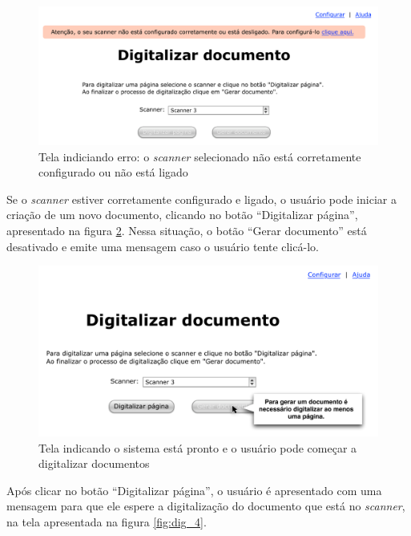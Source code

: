 \begin{figure}[h]
 \centering
  \includegraphics[scale=0.6]{img/mockups/digitalizacao-2.pdf}
  \caption {Tela indiciando erro: o {\it scanner} selecionado não está corretamente configurado ou não está ligado}
  \label{fig:dig_2}
\end{figure}

Se o {\it scanner} estiver corretamente configurado e ligado, o usuário pode iniciar a criação de um novo documento, clicando no botão ``Digitalizar página'', apresentado na figura \ref{fig:dig_3}. Nessa situação, o botão ``Gerar documento'' está desativado e emite uma mensagem caso o usuário tente clicá-lo.

\begin{figure}[h]
 \centering
  \includegraphics[scale=0.6]{img/mockups/digitalizacao-3.pdf}
  \caption {Tela indicando o sistema está pronto e o usuário pode começar a digitalizar documentos}
  \label{fig:dig_3}
\end{figure}

Após clicar no botão ``Digitalizar página'', o usuário é apresentado com uma mensagem para que ele espere a digitalização do documento que está no {\it scanner}, na tela apresentada na figura \ref{fig:dig_4}.

